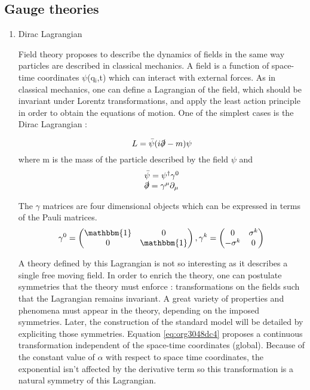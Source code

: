 \subsection{Gauge theories}
\label{sec:orga6a6451}
\begin{enumerate}
\item Dirac Lagrangian
\label{sec:org9b5a0cb}

Field theory proposes to describe the dynamics of fields in the same way particles are described in classical mechanics.
A field is a function of space-time coordinates \(\psi\)(q\(_{\text{i}}\),t) which can interact with external forces.
As in classical mechanics, one can define a Lagrangian of the field, which should be invariant under Lorentz transformations, and apply the least action principle in order to obtain the equations of motion.
One of the simplest cases is the Dirac Lagrangian :

\begin{equation}
\label{eq:orge86da29}
L = \bar{\psi}(i\slashed{\partial} -m)\psi
\end{equation}
where m is the mass of the particle described by the field \(\psi\) and
\begin{equation}
\begin{array}{l}
\bar{\psi} = \psi^\dagger \gamma^0\\
\slashed{\partial}=\gamma^\mu\partial_\mu
\end{array}
\end{equation}

The \(\gamma\) matrices are four dimensional objects which can be expressed in terms of the Pauli matrices.
\begin{equation}
\gamma^0=
\begin{pmatrix}
 \mathbbm{1} & 0 \\
0&  \mathbbm{1}
\end{pmatrix},
\gamma^k =
\begin{pmatrix}
 0&\sigma^k \\
-\sigma^k & 0
\end{pmatrix}
\end{equation}


A theory defined by this Lagrangian is not so interesting as it describes a single free moving field.
In order to enrich the theory, one can postulate symmetries that the theory must enforce : transformations on the fields such that the Lagrangian remains invariant.
A great variety of properties and phenomena must appear in the theory, depending on the imposed symmetries.
Later, the construction of the standard model will be detailed by expliciting those symmetries.
Equation \ref{eq:org3048dc4} proposes a continuous transformation independent of the space-time coordinates (global).
Because of the constant value of \(\alpha\) with respect to space time coordinates, the exponential isn't affected by the derivative term so this transformation is a natural symmetry of this Lagrangian.



\end{enumerate}
